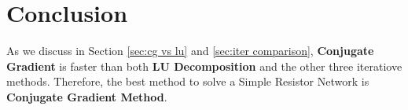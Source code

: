 \documentclass{article}
\begin{document}
\section{Conclusion}
As we discuss in Section \ref{sec:cg vs lu} and \ref{sec:iter comparison}, \textbf{Conjugate Gradient} is faster than both \textbf{LU Decomposition}
and the other three iteratiove methods. Therefore, the best method to solve a Simple Resistor Network is \textbf{Conjugate Gradient Method}.
\end{document}
